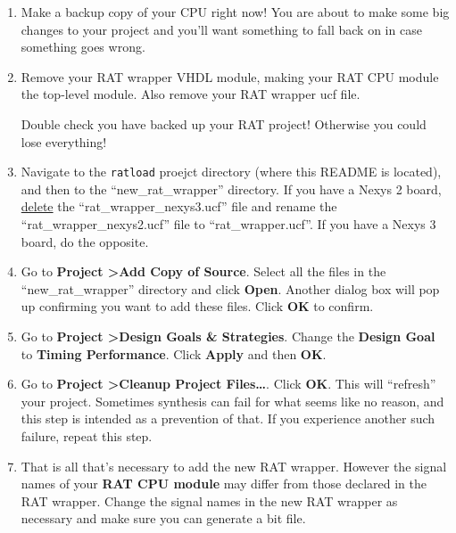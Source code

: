 \documentclass[notitlepage]{article}
\newcommand{\warningsign}{\fontencoding{U}\fontfamily{futs}\Large\selectfont\char 66\relax}
\begin{document}
\begin {enumerate}

\item Make a backup copy of your CPU right now! You are about to make some big changes to your project and you'll want something to fall back on in case something goes wrong.

\item Remove your RAT wrapper VHDL module, making your RAT CPU module the top-level module. Also remove your RAT wrapper ucf file.

\begin{infobox}
  {\warningsign} Double check you have backed up your RAT project! Otherwise you could lose everything!
\end{infobox}

\item Navigate to the \texttt{ratload} proejct directory (where this README is located), and then to the ``new\_rat\_wrapper'' directory. If you have a Nexys 2 board, \underline{delete} the ``rat\_wrapper\_nexys3.ucf'' file and rename the ``rat\_wrapper\_nexys2.ucf'' file to ``rat\_wrapper.ucf''. If you have a Nexys 3 board, do the opposite.

\item Go to \textbf{Project \textgreater Add Copy of Source}. Select all the files in the ``new\_rat\_wrapper'' directory and click \textbf{Open}. Another dialog box will pop up confirming you want to add these files. Click \textbf{OK} to confirm.

\item Go to \textbf{Project \textgreater Design Goals \& Strategies}. Change the \textbf{Design Goal} to \textbf{Timing Performance}. Click \textbf{Apply} and then \textbf{OK}.

\item Go to \textbf{Project \textgreater Cleanup Project Files\ldots}. Click \textbf{OK}. This will ``refresh'' your project. Sometimes synthesis can fail for what seems like no reason, and this step is intended as a prevention of that. If you experience another such failure, repeat this step.

\item That is all that's necessary to add the new RAT wrapper. However the signal names of your \textbf{RAT CPU module} may differ from those declared in the RAT wrapper. Change the signal names in the new RAT wrapper as necessary and make sure you can generate a bit file.
\end{enumerate}
\end{document}
